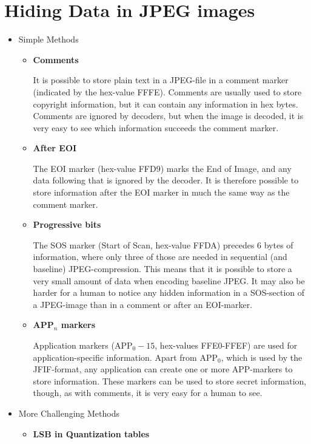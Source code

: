 
\section{Hiding Data in JPEG images}

\begin{itemize}
	\item Simple Methods
	\begin{itemize}
		\item \textbf{Comments}
		
		It is possible to store plain text in a JPEG-file in a comment marker (indicated by the hex-value FFFE).
		Comments are usually used to store copyright information, but it can contain any information in hex bytes.
		Comments are ignored by decoders, but when the image is decoded, it is very easy to see which information succeeds the comment marker.

		\item \textbf{After EOI}
		
		The EOI marker (hex-value FFD9) marks the End of Image, and any data following that is ignored by the decoder.
		It is therefore possible to store information after the EOI marker in much the same way as the comment marker.

		\item \textbf{Progressive bits}
		
		The SOS marker (Start of Scan, hex-value FFDA) precedes 6 bytes of information, where only three of those are needed in sequential (and baseline) JPEG-compression.
		This means that it is possible to store a very small amount of data when encoding baseline JPEG.
		It may also be harder for a human to notice any hidden information in a SOS-section of a JPEG-image than in a comment or after an EOI-marker.

		\item \textbf{APP$_n$ markers}
		
		Application markers (APP$_0-15$, hex-values FFE0-FFEF) are used for application-specific information.
		Apart from APP$_0$, which is used by the JFIF-format, any application can create one or more APP-markers to store information.
		These markers can be used to store secret information, though, as with comments, it is very easy for a human to see.
	\end{itemize}
	\item More Challenging Methods
	\begin{itemize}
		\item \textbf{LSB in Quantization tables}


\end{itemize}
\end{itemize}
